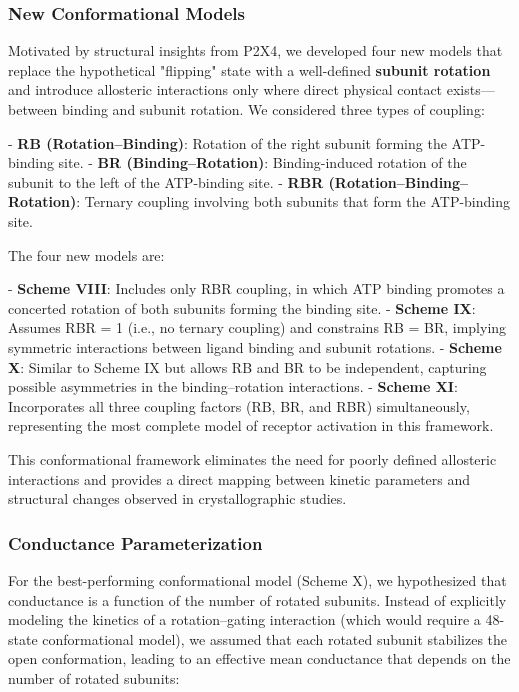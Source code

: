 \documentclass[pdflatex,sn-nature]{sn-jnl}%
\theoremstyle{thmstyleone}%
\theoremstyle{thmstyletwo}%
\theoremstyle{thmstylethree}%
\begin{document}
\subsubsection{New Conformational Models}

Motivated by structural insights from P2X4, we developed four new models that replace the hypothetical "flipping" state with a well-defined \textbf{subunit rotation} and introduce allosteric interactions only where direct physical contact exists—between binding and subunit rotation. We considered three types of coupling:

- \textbf{RB (Rotation–Binding)}: Rotation of the right subunit forming the ATP-binding site.  
- \textbf{BR (Binding–Rotation)}: Binding-induced rotation of the subunit to the left of the ATP-binding site.  
- \textbf{RBR (Rotation–Binding–Rotation)}: Ternary coupling involving both subunits that form the ATP-binding site.  

The four new models are:

- \textbf{Scheme VIII}: Includes only RBR coupling, in which ATP binding promotes a concerted rotation of both subunits forming the binding site.  
- \textbf{Scheme IX}: Assumes RBR = 1 (i.e., no ternary coupling) and constrains RB = BR, implying symmetric interactions between ligand binding and subunit rotations.  
- \textbf{Scheme X}: Similar to Scheme IX but allows RB and BR to be independent, capturing possible asymmetries in the binding–rotation interactions.  
- \textbf{Scheme XI}: Incorporates all three coupling factors (RB, BR, and RBR) simultaneously, representing the most complete model of receptor activation in this framework.  

This conformational framework eliminates the need for poorly defined allosteric interactions and provides a direct mapping between kinetic parameters and structural changes observed in crystallographic studies.

\subsubsection{Conductance Parameterization}

For the best-performing conformational model (Scheme X), we hypothesized that conductance is a function of the number of rotated subunits. Instead of explicitly modeling the kinetics of a rotation–gating interaction (which would require a 48-state conformational model), we assumed that each rotated subunit stabilizes the open conformation, leading to an effective mean conductance that depends on the number of rotated subunits:
\end{document}
